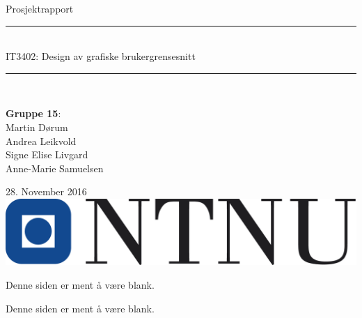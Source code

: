 \documentclass{article}
\begin{document}
\begin{center}
\vspace*{4.5cm}
\Huge{Prosjektrapport}\\[2pc]
\vspace{-1.5cm}
\noindent\rule{11cm}{0.8pt}\\

\Large{IT3402: Design av grafiske brukergrensesnitt}\\[1pc]
\vspace{-0.7cm}
\noindent\rule{11cm}{0.8pt}\\
\vspace{3.5cm}

\large{{\textbf{Gruppe 15}: \\
Martin Dørum\\
Andrea Leikvold\\
Signe Elise Livgard\\
Anne-Marie Samuelsen\\
}}
\vspace{2.0cm}

\large{28. November 2016}\\
\vspace{1.0cm}
\includegraphics[scale=0.6]{images/ntnu.png}
\end{center}

\setlength{\parindent}{4em}
\setlength{\parskip}{1em} %
\renewcommand{\baselinestretch}{1.3} %

\thispagestyle{empty} %
\newpage
\thispagestyle{empty}
\begin{center}
Denne siden er ment å være blank.
\end{center}
\null\newpage
\setcounter{page}{1}

\tableofcontents
\newpage
\listoftables
\newpage
\listoffigures
\newpage
\newpage
\begin{center}
Denne siden er ment å være blank.
\end{center}
\null\newpage

\setcounter{page}{1}


\newpage


\newpage


\newpage


\newpage


\newpage


\newpage


\newpage


\newpage


\newpage


\newpage


\end{document}
